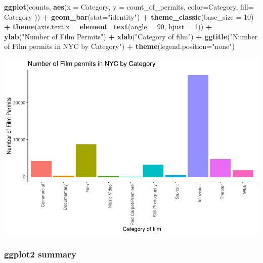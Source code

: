 \documentclass[
]{book}
\newenvironment{Shaded}{\begin{snugshade}}{\end{snugshade}}
\newcommand{\AttributeTok}[1]{\textcolor[rgb]{0.13,0.29,0.53}{#1}}
\newcommand{\DecValTok}[1]{\textcolor[rgb]{0.00,0.00,0.81}{#1}}
\newcommand{\FunctionTok}[1]{\textcolor[rgb]{0.13,0.29,0.53}{\textbf{#1}}}
\newcommand{\NormalTok}[1]{#1}
\newcommand{\SpecialCharTok}[1]{\textcolor[rgb]{0.81,0.36,0.00}{\textbf{#1}}}
\newcommand{\StringTok}[1]{\textcolor[rgb]{0.31,0.60,0.02}{#1}}
\begin{document}
\begin{Shaded}
\begin{Highlighting}[]
\FunctionTok{ggplot}\NormalTok{(counts, }\FunctionTok{aes}\NormalTok{(}\AttributeTok{x =}\NormalTok{ Category, }\AttributeTok{y =}\NormalTok{ count\_of\_permits, }
                   \AttributeTok{color=}\NormalTok{Category, }
                   \AttributeTok{fill=}\NormalTok{ Category )) }\SpecialCharTok{+}
  \FunctionTok{geom\_bar}\NormalTok{(}\AttributeTok{stat=}\StringTok{"identity"}\NormalTok{) }\SpecialCharTok{+} 
  \FunctionTok{theme\_classic}\NormalTok{(}\AttributeTok{base\_size =} \DecValTok{10}\NormalTok{) }\SpecialCharTok{+}
  \FunctionTok{theme}\NormalTok{(}\AttributeTok{axis.text.x =} \FunctionTok{element\_text}\NormalTok{(}\AttributeTok{angle =} \DecValTok{90}\NormalTok{, }\AttributeTok{hjust =} \DecValTok{1}\NormalTok{)) }\SpecialCharTok{+}
  \FunctionTok{ylab}\NormalTok{(}\StringTok{"Number of Film Permits"}\NormalTok{) }\SpecialCharTok{+} 
  \FunctionTok{xlab}\NormalTok{(}\StringTok{"Category of film"}\NormalTok{) }\SpecialCharTok{+}
  \FunctionTok{ggtitle}\NormalTok{(}\StringTok{"Number of Film permits in NYC by Category"}\NormalTok{) }\SpecialCharTok{+}
  \FunctionTok{theme}\NormalTok{(}\AttributeTok{legend.position=}\StringTok{"none"}\NormalTok{) }
\end{Highlighting}
\end{Shaded}

\includegraphics{Statistics_Lab_files/figure-latex/1categoryL-1.pdf}

\hypertarget{ggplot2-summary}{%
\subsubsection{ggplot2 summary}\label{ggplot2-summary}}
\end{document}
